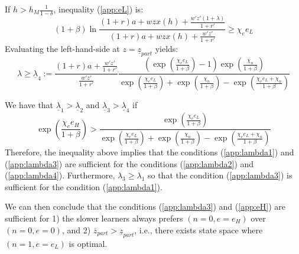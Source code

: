\documentclass[12pt]{article}
\begin{document}
\noindent If $h>h_M\frac{1}{1-\delta}$, inequality (\ref{app:eL}) is:
\begin{equation*}
    (1+\beta)\ln\frac{(1+r)a+wzx(h)+\frac{w'z'(1+\lambda)}{1+r'}}{(1+r)a+wzx(h)+\frac{w'z'}{1+r'}} \geq \chi_e e_L 
\end{equation*}
Evaluating the left-hand-side at $z=\underline{z}_{part}$ yields:
\begin{equation}
    \lambda \geq \underline{\lambda}_4:=\frac{(1+r)a+\frac{w'z'}{1+r'}}{\frac{w'z'}{1+r'}}\frac{\left(\exp(\frac{\chi_e e_L}{1+\beta})-1\right)\exp(\frac{\chi_n}{1+\beta})}{\exp(\frac{\chi_e e_L}{1+\beta})+\exp(\frac{\chi_n}{1+\beta})-\exp(\frac{\chi_e e_L + \chi_n}{1+\beta})} \label{app:lambda4}
\end{equation}

We have that $\underline{\lambda}_1>\underline{\lambda}_2$ and $\underline{\lambda}_3>\underline{\lambda}_4$ if 
\begin{equation} \label{app:eH}
    \exp(\frac{\chi_e e_H}{1+\beta})>\frac{\exp(\frac{\chi_e e_L}{1+\beta})}{\exp(\frac{\chi_e e_L}{1+\beta})+\exp(\frac{\chi_n}{1+\beta})-\exp(\frac{\chi_e e_L + \chi_n}{1+\beta})}
\end{equation}
Therefore, the inequality above implies that the conditions (\ref{app:lambda1}) and (\ref{app:lambda3}) are sufficient for the conditions (\ref{app:lambda2}) and (\ref{app:lambda4}). Furthermore, $\lambda_3 \geq \lambda_1$ so that the condition (\ref{app:lambda3}) is sufficient for the condition (\ref{app:lambda1}). 

We can then conclude that the conditions (\ref{app:lambda3}) and (\ref{app:eH}) are sufficient for 1) the slower learners always prefers $(n=0,e=e_H)$ over $(n=0,e=0)$, and 2) $\overline{z}_{part}>\underline{z}_{part}$, i.e., there exists state space where $(n=1,e=e_L)$ is optimal.
\end{document}
